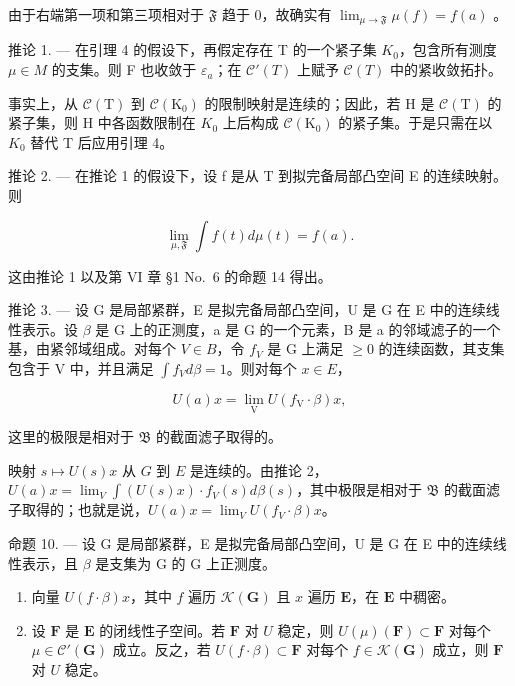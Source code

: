 由于右端第一项和第三项相对于 \(\mathfrak{F}\) 趋于 0，故确实有 \(\lim_{\mu \to \mathfrak{F}} \mu(f) = f(a)\) 。

推论 1. --- 在引理 4 的假设下，再假定存在 T 的一个紧子集 \(K_{0}\)，包含所有测度 \(\mu \in M\) 的支集。则 F 也收敛于 \(\varepsilon_{a}\)；在 \(\mathcal{C}'(T)\) 上赋予 \(\mathcal{C}(T)\) 中的紧收敛拓扑。

事实上，从 \(\mathcal{C}(\mathrm{T})\) 到 \(\mathcal{C}(\mathrm{K}_{0})\) 的限制映射是连续的；因此，若 H 是 \(\mathcal{C}(\mathrm{T})\) 的紧子集，则 H 中各函数限制在 \(K_{0}\) 上后构成 \(\mathcal{C}(\mathrm{K}_{0})\) 的紧子集。于是只需在以 \(K_{0}\) 替代 T 后应用引理 4。

推论 2. --- 在推论 1 的假设下，设 f 是从 T 到拟完备局部凸空间 E 的连续映射。则

\[
\lim _ {\mu , \mathfrak {F}} \int f (t) d \mu (t) = f (a).
\]

这由推论 1 以及第 VI 章 §1 No.~6 的命题 14 得出。

推论 3. --- 设 G 是局部紧群，E 是拟完备局部凸空间，U 是 G 在 E 中的连续线性表示。设 \(\beta\) 是 G 上的正测度，a 是 G 的一个元素，B 是 a 的邻域滤子的一个基，由紧邻域组成。对每个 \(V \in B\)，令 \(f_{V}\) 是 G 上满足 \(\geqslant 0\) 的连续函数，其支集包含于 V 中，并且满足 \(\int f_{V} d\beta = 1\)。则对每个 \(x \in E\)，

\[
U (a) x = \lim _ {\mathrm{V}} U (f _ {\mathrm{V}} \cdot \beta) x,
\]

这里的极限是相对于 \(\mathfrak{B}\) 的截面滤子取得的。

映射 \(s \mapsto U(s)x\) 从 \(G\) 到 \(E\) 是连续的。由推论 2，\(U(a)x = \lim_{V} \int (U(s)x) \cdot f_V(s) d\beta(s)\)，其中极限是相对于 \(\mathfrak{B}\) 的截面滤子取得的；也就是说，\(U(a)x = \lim_{V} U(f_V \cdot \beta)x\)。

命题 10. --- 设 G 是局部紧群，E 是拟完备局部凸空间，U 是 G 在 E 中的连续线性表示，且 \(\beta\) 是支集为 G 的 G 上正测度。

\begin{enumerate}
\def\labelenumi{(\roman{enumi})}
\item
  向量 \(U(f \cdot \beta)x\)，其中 \(f\) 遍历 \(\mathcal{K}(\mathbf{G})\) 且 \(x\) 遍历 \(\mathbf{E}\)，在 \(\mathbf{E}\) 中稠密。
\item
  设 \(\mathbf{F}\) 是 \(\mathbf{E}\) 的闭线性子空间。若 \(\mathbf{F}\) 对 \(U\) 稳定，则 \(U(\mu)(\mathbf{F}) \subset \mathbf{F}\) 对每个 \(\mu \in \mathcal{C}'(\mathbf{G})\) 成立。反之，若 \(U(f \cdot \beta) \subset \mathbf{F}\) 对每个 \(f \in \mathcal{K}(\mathbf{G})\) 成立，则 \(\mathbf{F}\) 对 \(U\) 稳定。
\end{enumerate}

